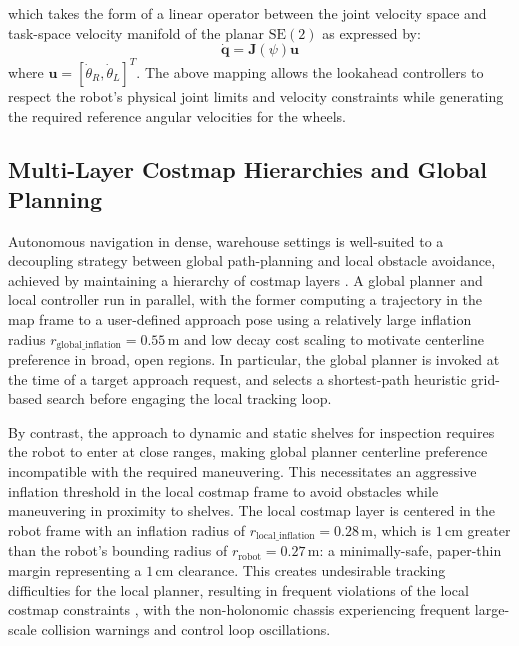which takes the form of a linear operator between the joint velocity space and task-space velocity manifold of the planar $\text{SE}(2)$ as expressed by:
\begin{equation}
\dot{\mathbf{q}} = \mathbf{J}(\psi) \mathbf{u} \label{eq:jacobian_velocity_mapping}
\end{equation}
where $\mathbf{u} = [\dot{\theta}_R, \dot{\theta}_L]^T$. The above mapping allows the lookahead controllers to respect the robot's physical joint limits and velocity constraints while generating the required reference angular velocities for the wheels.

\subsection{Multi-Layer Costmap Hierarchies and Global Planning}

Autonomous navigation in dense, warehouse settings is well-suited to a decoupling strategy between global path-planning and local obstacle avoidance, achieved by maintaining a hierarchy of costmap layers \cite{macenski2023survey}. A global planner and local controller run in parallel, with the former computing a trajectory in the map frame to a user-defined approach pose using a relatively large inflation radius $r_{\text{global\_inflation}} = 0.55\,\text{m}$ and low decay cost scaling to motivate centerline preference in broad, open regions. In particular, the global planner is invoked at the time of a target approach request, and selects a shortest-path heuristic grid-based search before engaging the local tracking loop.

By contrast, the approach to dynamic and static shelves for inspection requires the robot to enter at close ranges, making global planner centerline preference incompatible with the required maneuvering. This necessitates an aggressive inflation threshold in the local costmap frame to avoid obstacles while maneuvering in proximity to shelves. The local costmap layer is centered in the robot frame with an inflation radius of $r_{\text{local\_inflation}} = 0.28\,\text{m}$, which is $1\,\text{cm}$ greater than the robot's bounding radius of $r_{\text{robot}} = 0.27\,\text{m}$: a minimally-safe, paper-thin margin representing a $1\,\text{cm}$ clearance. This creates undesirable tracking difficulties for the local planner, resulting in frequent violations of the local costmap constraints \cite{mlinarcek2026costmap}, with the non-holonomic chassis experiencing frequent large-scale collision warnings and control loop oscillations.

